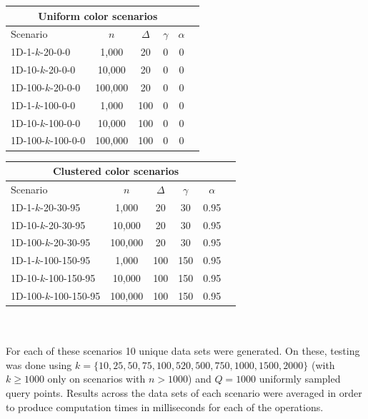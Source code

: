 \documentclass{article}
\begin{document}
\hskip-2.3cm
\begin{tabular}{|l||c|c|c|c|c|}
    \hline
    \multicolumn{5}{|c|}{Uniform color scenarios}             \\
    \hline
    Scenario       & $n$     & $\Delta$ & $\gamma$ & $\alpha$ \\
    \hline
    1D-1-$k$-20-0-0    & 1,000   & 20       & 0        & 0        \\
    1D-10-$k$-20-0-0   & 10,000  & 20       & 0        & 0        \\
    1D-100-$k$-20-0-0  & 100,000 & 20       & 0        & 0        \\
    1D-1-$k$-100-0-0   & 1,000   & 100      & 0        & 0        \\
    1D-10-$k$-100-0-0  & 10,000  & 100      & 0        & 0        \\
    1D-100-$k$-100-0-0 & 100,000 & 100      & 0        & 0        \\
    \hline
\end{tabular}
\:\:
\begin{tabular}{|l||c|c|c|c|c|}
    \hline
    \multicolumn{5}{|c|}{Clustered color scenarios}              \\
    \hline
    Scenario          & $n$     & $\Delta$ & $\gamma$ & $\alpha$ \\
    \hline
    1D-1-$k$-20-30-95     & 1,000   & 20       & 30       & 0.95     \\
    1D-10-$k$-20-30-95    & 10,000  & 20       & 30       & 0.95     \\
    1D-100-$k$-20-30-95   & 100,000 & 20       & 30       & 0.95     \\
    1D-1-$k$-100-150-95   & 1,000   & 100      & 150      & 0.95     \\
    1D-10-$k$-100-150-95  & 10,000  & 100      & 150      & 0.95     \\
    1D-100-$k$-100-150-95 & 100,000 & 100      & 150      & 0.95     \\
    \hline
\end{tabular}\\\\
For each of these scenarios 10 unique data sets were generated. On these, testing was done using $k=\{10, 25, 50, 75, 100, 520, 500, 750, 1000, 1500, 2000\}$ (with $k\geq1000$ only on scenarios with $n > 1000$) and $Q=1000$ uniformly sampled query points. Results across the data sets of each scenario were averaged in order to produce computation times in milliseconds for each of the operations. \\\\
\end{document}
